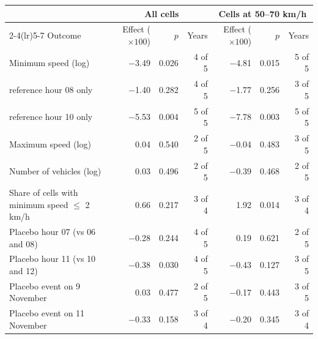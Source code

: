 \begin{tabular}{lrrrrrr}
\toprule
 & \multicolumn{3}{c}{All cells} & \multicolumn{3}{c}{Cells at 50--70 km/h} \\
\cmidrule(lr){2-4}\cmidrule(lr){5-7}
Outcome & Effect ($\times 100$) & $p$ & Years & Effect ($\times 100$) & $p$ & Years \\
\midrule
Minimum speed (log) & \ensuremath{-}3.49 & 0.026 & 4 of 5 & \ensuremath{-}4.81 & 0.015 & 5 of 5 \\
\quad reference hour 08 only & \ensuremath{-}1.40 & 0.282 & 4 of 5 & \ensuremath{-}1.77 & 0.256 & 3 of 5 \\
\quad reference hour 10 only & \ensuremath{-}5.53 & 0.004 & 5 of 5 & \ensuremath{-}7.78 & 0.003 & 5 of 5 \\
Maximum speed (log) & 0.04 & 0.540 & 2 of 5 & \ensuremath{-}0.04 & 0.483 & 3 of 5 \\
Number of vehicles (log) & 0.03 & 0.496 & 2 of 5 & \ensuremath{-}0.39 & 0.468 & 2 of 5 \\
Share of cells with minimum speed $\leq$ 2 km/h & 0.66 & 0.217 & 3 of 4 & 1.92 & 0.014 & 3 of 4 \\
\addlinespace
Placebo hour 07 (vs 06 and 08) & \ensuremath{-}0.28 & 0.244 & 4 of 5 & 0.19 & 0.621 & 2 of 5 \\
Placebo hour 11 (vs 10 and 12) & \ensuremath{-}0.38 & 0.030 & 4 of 5 & \ensuremath{-}0.43 & 0.127 & 3 of 5 \\
\addlinespace
Placebo event on 9 November & 0.03 & 0.477 & 2 of 5 & \ensuremath{-}0.17 & 0.443 & 3 of 5 \\
Placebo event on 11 November & \ensuremath{-}0.33 & 0.158 & 3 of 4 & \ensuremath{-}0.20 & 0.345 & 3 of 4 \\
\bottomrule
\end{tabular}

